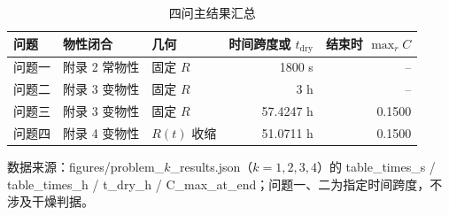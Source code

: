 \begin{table}[H]
  \centering
  \caption{四问主结果汇总}
  \label{tab:main_results}
  \begin{tabular}{lllrr}
    \toprule
    问题 & 物性闭合 & 几何 & 时间跨度或 $t_{\mathrm{dry}}$ & 结束时 $\max_r C$ \\
    \midrule
    问题一 & 附录 2 常物性 & 固定 $R$ & 1800 s & -- \\
    问题二 & 附录 3 变物性 & 固定 $R$ & 3 h & -- \\
    问题三 & 附录 3 变物性 & 固定 $R$ & 57.4247 h & 0.1500 \\
    问题四 & 附录 4 变物性 & $R(t)$ 收缩 & 51.0711 h & 0.1500 \\
    \bottomrule
  \end{tabular}
  \par\vspace{2pt}\footnotesize 数据来源：figures/problem\_$k$\_results.json（$k=1,2,3,4$）的 table\_times\_s / table\_times\_h / t\_dry\_h / C\_max\_at\_end；问题一、二为指定时间跨度，不涉及干燥判据。
\end{table}
